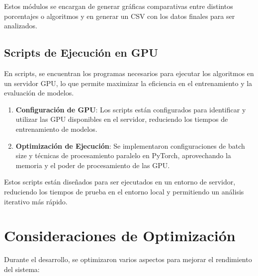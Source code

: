 Estos módulos se encargan de generar gráficas comparativas entre distintos porcentajes o algoritmos y en
generar un CSV con los datos finales para ser analizados.

\subsection{Scripts de Ejecución en GPU}\label{subsec:scripts-de-ejecucion-en-gpu}
En scripts, se encuentran los programas necesarios para ejecutar los algoritmos en un servidor GPU, lo que permite
maximizar la eficiencia en el entrenamiento y la evaluación de modelos.
\begin{enumerate}
      \item \textbf{Configuración de GPU}: Los scripts están configurados para identificar y utilizar las GPU disponibles
            en el servidor, reduciendo los tiempos de entrenamiento de modelos.
      \item \textbf{Optimización de Ejecución}: Se implementaron configuraciones de batch size y técnicas de
            procesamiento paralelo en PyTorch, aprovechando la memoria y el poder de procesamiento de las GPU\@.
\end{enumerate}

Estos scripts están diseñados para ser ejecutados en un entorno de servidor, reduciendo los tiempos de prueba en el
entorno local y permitiendo un análisis iterativo más rápido.

\section{Consideraciones de Optimización}\label{sec:consideraciones-de-optimizacion}
Durante el desarrollo, se optimizaron varios aspectos para mejorar el rendimiento del sistema:

